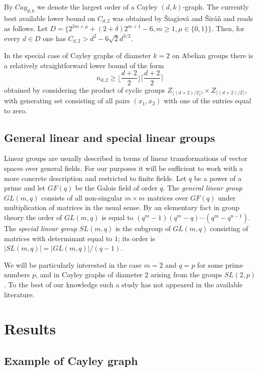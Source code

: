 \documentclass[a4paper,12pt,oneside]{report}%
\begin{document}
By $Cay_{d,k}$ we denote the largest order of a Cayley $(d,k)$-graph.
The currently best available lower bound on $C_{d,2}$ was obtained by \v{S}iagiov\'a and \v{S}ir\'a\v{n} \cite{Sia-Sir} and reads as follows. Let $D = \{ 2^{2m+\mu}+(2+\delta)2^{m+1}-6,m \geq 1, \mu \in \{0,1\} \}$. Then, for every $d\in D$ one has $C_{d,2} > d^{2} - 6\sqrt{2}d^{3/2}$.

In the special case of Cayley graphs of diameter $k=2$ on Abelian groups there is a relatively straightforward lower bound of the form
\begin{equation*}
	n_{d,2} \geq \lfloor \frac{d+2}{2} \rfloor \lceil \frac{d + 2}{2} \rceil
\end{equation*}	
obtained by considering the product of cyclic groups $Z_{ \lfloor (d+2)/2  \rfloor) } \times Z_{ \lceil (d+2)/2 \rceil }$, with generating set consisting of all pairs $(x_1,x_2)$ with one of the entries equal to zero.

\subsection{General linear and special linear groups}

Linear groups are usually described in terms of linear transformations of vector spaces over general fields. For our purposes it will be sufficient to work with a more concrete description and restricted to finite fields. Let $q$ be a power of a prime and let $GF(q)$ be the Galois field of order $q$. The {\em general linear group} $GL(m,q)$ consists of all non-singular $m\times m$ matrices over $GF(q)$ under multiplication of matrices in the usual sense. By an elementary fact in group theory the order of $GL(m,q)$ is equal to $(q^m - 1)(q^m - q) \cdots (q^m - q^{n-1})$. The {\em special linear group} $SL(m,q)$ is the subgroup of $GL(m,q)$ consisting of matrices with determinant equal to $1$; its order is $|SL(m,q)| = |GL(m,q)|/(q-1)$.
\medskip

We will be particularly interested in the case $m=2$ and $q=p$ for some prime numbers $p$, and in Cayley graphs of diameter $2$ arising from the groups $SL(2,p)$. To the best of our knowledge such a study has not appeared in the available literature.

\section{Results}

\subsection{Example of Cayley graph}
\end{document}
